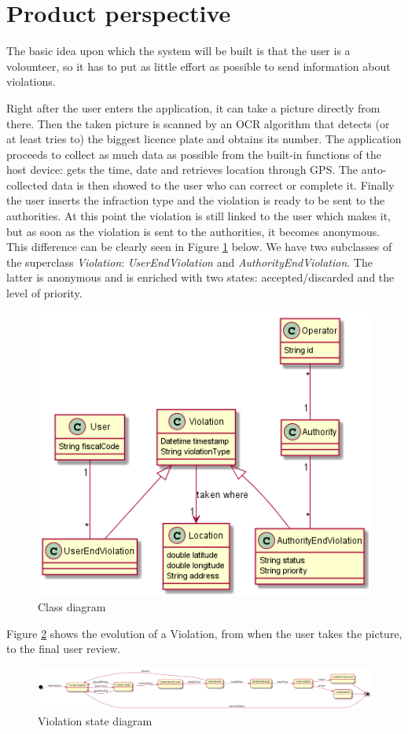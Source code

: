 \section{Product perspective}
The basic idea upon which the system will be built is that the user is a volounteer, so it has to put as little effort as possible to send information about violations.

Right after the user enters the application, it can take a picture directly from there. Then the taken picture is scanned by an OCR algorithm that detects (or at least tries to) the biggest licence plate and obtains its number. The application proceeds to collect as much data as possible from the built-in functions of the host device: gets the time, date and retrieves location through GPS. The auto-collected data is then showed to the user who can correct or complete it.
Finally the user inserts the infraction type and the violation is ready to be sent to the authorities. At this point the violation is still linked to the user which makes it, but as soon as the violation is sent to the authorities, it becomes anonymous. This difference can be clearly seen in Figure \ref{fig:classDiagram} below. We have two subclasses of the superclass \emph{Violation}: \emph{UserEndViolation} and \emph{AuthorityEndViolation}. The latter is anonymous and is enriched with two states: accepted/discarded and the level of priority.

\begin{figure}[H]
    \centering
    \includegraphics[width=0.5\linewidth]{../diagrams/classDiagram.png}
    \caption{Class diagram}
    \label{fig:classDiagram}
\end{figure}

Figure \ref{fig:violationDiagram} shows the evolution of a Violation, from when the user takes the picture, to the final user review.

\begin{figure}[H]
    \centering
    \includegraphics[width=\linewidth]{../diagrams/state_diagram_violation.png}
    \caption{Violation state diagram}
    \label{fig:violationDiagram}
\end{figure}

